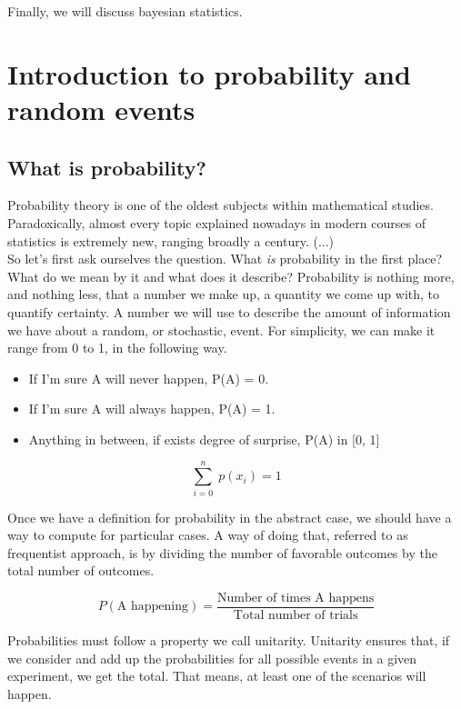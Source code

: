 \documentclass{book}
\begin{document}
Finally, we will discuss bayesian statistics.

\chapter{Introduction to probability and random events}

\section{What is probability?}
Probability theory is one of the oldest subjects within mathematical studies. Paradoxically, almost every topic explained nowadays in modern courses of statistics is extremely new, ranging broadly a century. (...)\\

So let's first ask ourselves the question. What \textit{is} probability in the first place? What do we mean by it and what does it describe? Probability is nothing more, and nothing less, that a number we make up, a quantity we come up with, to quantify certainty. A number we will use to describe the amount of information we have about a random, or stochastic, event. For simplicity, we can make it range from 0 to 1, in the following way.

\begin{itemize}
\item If I'm sure A will never happen, P(A) = 0.
\item If I'm sure A will always happen,  P(A) = 1.
\item Anything in between, if exists degree of surprise, P(A) in [0, 1]
\end{itemize}

\begin{equation}
	\sum_{i = 0}^{n} \; p(x_{i}) = 1
\end{equation}

Once we have a definition for probability in the abstract case, we should have a way to compute for particular cases. A way of doing that, referred to as frequentist approach, is by dividing the number of favorable outcomes by the total number of outcomes.

\begin{equation}
	P(\text{A happening}) = \frac{\text{Number of times A happens}}{\text{Total number of trials}}
\end{equation}

Probabilities must follow a property we call unitarity. Unitarity ensures that, if we consider and add up the probabilities for all possible events in a given experiment, we get the total. That means, at least one of the scenarios will happen.\\
\end{document}
